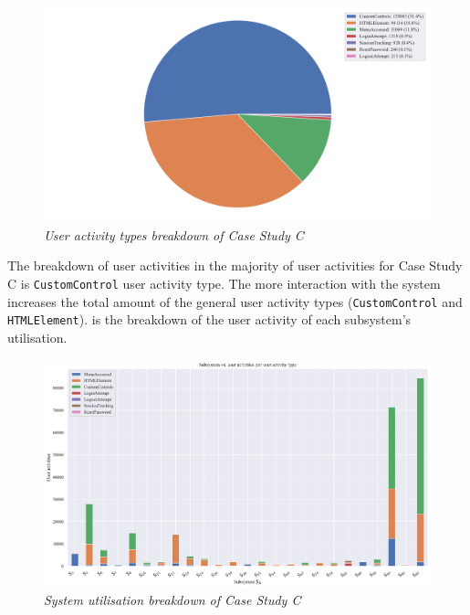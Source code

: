 \begin{figure}[!htb]
	\centering %
	\includegraphics[width=0.95\linewidth]{img/ch3/analysis/case_C_breakdown.pdf}
	\caption[User activity types breakdown of Case Study C]
	{\textit{User activity types breakdown of Case Study C}}\label{fig:ch3_caseCBreakdown}
\end{figure}

The breakdown of user activities in  the majority of user activities for Case Study C is \texttt{CustomControl} user activity type. The more interaction with the system increases the total amount of the general user activity types (\texttt{CustomControl} and \texttt{HTMLElement}).  is the breakdown of the user activity of each subsystem's utilisation.

\begin{figure}[!htb]
	\centering %
	\includegraphics[width=0.95\linewidth]{img/ch3/analysis/case_C_subsystems_1.pdf}
	\caption[System utilisation breakdown of Case Study C]
	{\textit{System utilisation breakdown of Case Study C}}\label{fig:ch3_caseCAnalysis}
\end{figure} 

